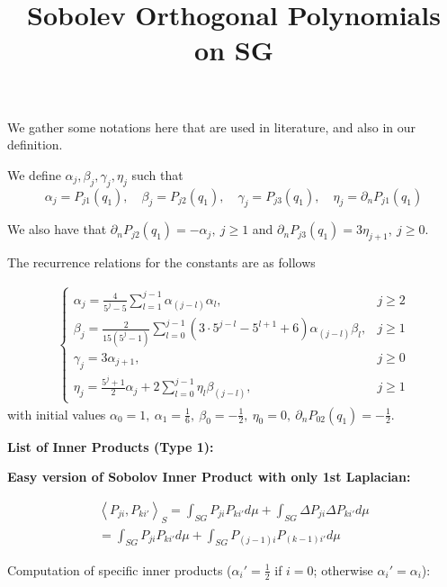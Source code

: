 \documentclass[12pt]{article}
\theoremstyle{plain}
\theoremstyle{definition}
\theoremstyle{remark}
\newcommand{\inner}[2]{\left \langle #1, #2\right \rangle}
\newcommand{\lap}{\Delta}
\begin{document}
\title{Sobolev Orthogonal Polynomials on SG}%
\author{} %
 
\maketitle
We gather some notations here that are used in literature, and also in our definition.

We define $\alpha_j, \beta_j, \gamma_j, \eta_j$ such that 
$$\alpha_j = P_{j1}(q_1), \quad \beta_j = P_{j2}(q_1), \quad \gamma_j = P_{j3}(q_1), \quad \eta_j = \partial_nP_{j1}(q_1)$$

We also have that $\partial_nP_{j2}(q_1) = -\alpha_j,\ j \geq 1$ and $\partial_nP_{j3}(q_1) = 3\eta_{j+1},\ j \geq 0$. 

The recurrence relations for the constants are as follows \cite{NSTY}

\begin{gather}
    \begin{cases}
    \alpha_j = \frac{4}{5^j - 5}\sum\limits_{l=1}^{j-1}\alpha_{(j-l)}\alpha_l, & j \geq 2\\
    \beta_j = \frac{2}{15(5^j - 1)}\sum\limits_{l=0}^{j-1}(3\cdot 5^{j-l} - 5^{l+1} + 6)\alpha_{(j-l)}\beta_l, & j \geq 1\\
    \gamma_j = 3\alpha_{j+1}, & j \geq 0\\
    \eta_j = \frac{5^j +1}{2}\alpha_j + 2\sum\limits_{l=0}^{j-1}\eta_l\beta_{(j-l)}, & j \geq 1
    \end{cases}
\end{gather}
with initial values $\alpha_0 = 1,\ \alpha_1 = \frac16, \ \beta_0 = -\frac12, \ \eta_0 = 0, \ \partial_nP_{02}(q_1) = -\frac12$.

\newpage

\textbf{List of Inner Products (Type 1):}

\textbf{Easy version of Sobolov Inner Product with only 1st Laplacian:}

\begin{gather}
\inner{P_{ji}}{P_{ki'}}_S = \int_{SG} P_{ji}P_{ki'} d \mu  + \int_{SG} \lap P_{ji}\lap P_{ki'} d \mu\\
= \int_{SG} P_{ji}P_{ki'} d \mu  + \int_{SG} P_{(j-1)i} P_{(k-1)i'} d \mu
\end{gather}

Computation of specific inner products ($\alpha_i'=\frac12$ if $i=0$; otherwise $\alpha_i'=\alpha_i$):
\end{document}

